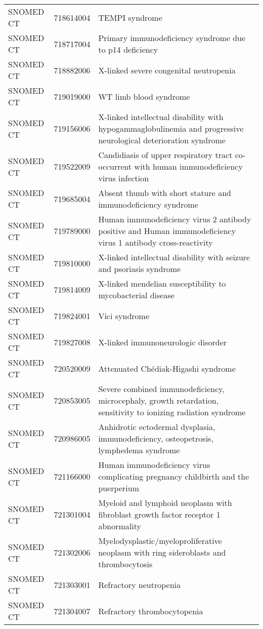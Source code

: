 \begin{longtable}{p{}p{}p{}}
  SNOMED CT & 718614004 & TEMPI syndrome \\ 
  SNOMED CT & 718717004 & Primary immunodeficiency syndrome due to p14 deficiency \\ 
  SNOMED CT & 718882006 & X-linked severe congenital neutropenia \\ 
  SNOMED CT & 719019000 & WT limb blood syndrome \\ 
  SNOMED CT & 719156006 & X-linked intellectual disability with hypogammaglobulinemia and progressive neurological deterioration syndrome \\ 
  SNOMED CT & 719522009 & Candidiasis of upper respiratory tract co-occurrent with human immunodeficiency virus infection \\ 
  SNOMED CT & 719685004 & Absent thumb with short stature and immunodeficiency syndrome \\ 
  SNOMED CT & 719789000 & Human immunodeficiency virus 2 antibody positive and Human immunodeficiency virus 1 antibody cross-reactivity \\ 
  SNOMED CT & 719810000 & X-linked intellectual disability with seizure and psoriasis syndrome \\ 
  SNOMED CT & 719814009 & X-linked mendelian susceptibility to mycobacterial disease \\ 
  SNOMED CT & 719824001 & Vici syndrome \\ 
  SNOMED CT & 719827008 & X-linked immunoneurologic disorder \\ 
  SNOMED CT & 720520009 & Attenuated Chédiak-Higashi syndrome \\ 
  SNOMED CT & 720853005 & Severe combined immunodeficiency, microcephaly, growth retardation, sensitivity to ionizing radiation syndrome \\ 
  SNOMED CT & 720986005 & Anhidrotic ectodermal dysplasia, immunodeficiency, osteopetrosis, lymphedema syndrome \\ 
  SNOMED CT & 721166000 & Human immunodeficiency virus complicating pregnancy childbirth and the puerperium \\ 
  SNOMED CT & 721301004 & Myeloid and lymphoid neoplasm with fibroblast growth factor receptor 1 abnormality \\ 
  SNOMED CT & 721302006 & Myelodysplastic/myeloproliferative neoplasm with ring sideroblasts and thrombocytosis \\ 
  SNOMED CT & 721303001 & Refractory neutropenia \\ 
  SNOMED CT & 721304007 & Refractory thrombocytopenia \\ 

\end{longtable}

